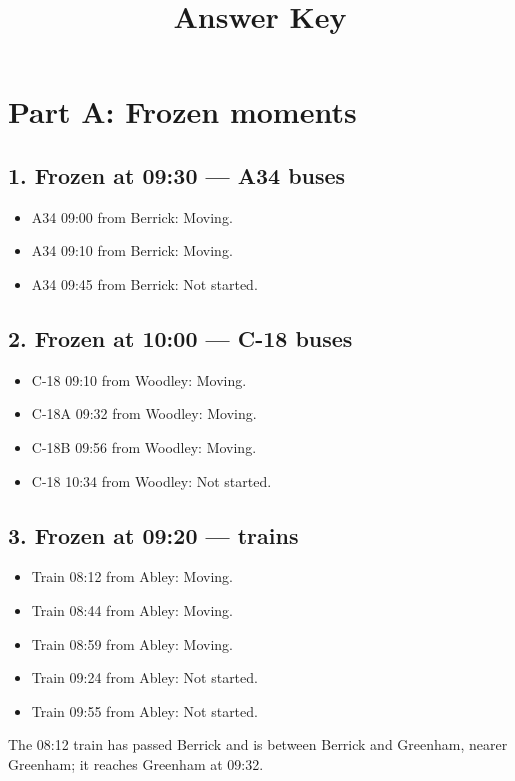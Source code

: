 \documentclass[11pt,a4paper]{article}
\title{Answer Key}
\date{}
\begin{document}
\maketitle

\section*{Part A: Frozen moments}

\subsection*{1. Frozen at 09:30 --- A34 buses}
\begin{itemize}[leftmargin=*]
\item A34 09:00 from Berrick: Moving.
\item A34 09:10 from Berrick: Moving.
\item A34 09:45 from Berrick: Not started.
\end{itemize}

\subsection*{2. Frozen at 10:00 --- C-18 buses}
\begin{itemize}[leftmargin=*]
\item C-18 09:10 from Woodley: Moving.
\item C-18A 09:32 from Woodley: Moving.
\item C-18B 09:56 from Woodley: Moving.
\item C-18 10:34 from Woodley: Not started.
\end{itemize}

\subsection*{3. Frozen at 09:20 --- trains}
\begin{itemize}[leftmargin=*]
\item Train 08:12 from Abley: Moving.
\item Train 08:44 from Abley: Moving.
\item Train 08:59 from Abley: Moving.
\item Train 09:24 from Abley: Not started.
\item Train 09:55 from Abley: Not started.
\end{itemize}
The 08:12 train has passed Berrick and is between Berrick and Greenham, nearer Greenham; it reaches Greenham at 09:32.
\end{document}
